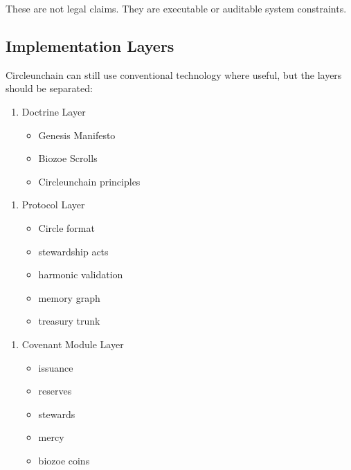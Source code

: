 ﻿\documentclass[12pt]{article}
\begin{document}
These are not legal claims. They are executable or auditable system constraints.

\subsection{Implementation Layers}


Circleunchain can still use conventional technology where useful, but the layers should be separated:

\begin{enumerate}
  \item Doctrine Layer
\begin{itemize}
  \item Genesis Manifesto
\end{itemize}
\begin{itemize}
  \item Biozoe Scrolls
\end{itemize}
\begin{itemize}
  \item Circleunchain principles
\end{itemize}
\end{enumerate}

\begin{enumerate}
  \item Protocol Layer
\begin{itemize}
  \item Circle format
\end{itemize}
\begin{itemize}
  \item stewardship acts
\end{itemize}
\begin{itemize}
  \item harmonic validation
\end{itemize}
\begin{itemize}
  \item memory graph
\end{itemize}
\begin{itemize}
  \item treasury trunk
\end{itemize}
\end{enumerate}

\begin{enumerate}
  \item Covenant Module Layer
\begin{itemize}
  \item issuance
\end{itemize}
\begin{itemize}
  \item reserves
\end{itemize}
\begin{itemize}
  \item stewards
\end{itemize}
\begin{itemize}
  \item mercy
\end{itemize}
\begin{itemize}
  \item biozoe coins
\end{itemize}
\end{enumerate}
\end{document}
